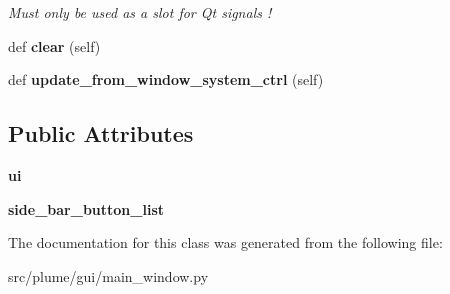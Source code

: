 \begin{DoxyCompactItemize}
\begin{DoxyCompactList}\small\item\em Must only be used as a slot for Qt signals ! \end{DoxyCompactList}\item 
def {\bfseries clear} (self)\hypertarget{classplume-creator_1_1src_1_1plume_1_1gui_1_1main__window_1_1_side_bar_a949f124568cf97ff7f7131efe75b008b}{}\label{classplume-creator_1_1src_1_1plume_1_1gui_1_1main__window_1_1_side_bar_a949f124568cf97ff7f7131efe75b008b}

\item 
def {\bfseries update\+\_\+from\+\_\+window\+\_\+system\+\_\+ctrl} (self)\hypertarget{classplume-creator_1_1src_1_1plume_1_1gui_1_1main__window_1_1_side_bar_a98cfba7845f1b5f1a1de0ee367d4e120}{}\label{classplume-creator_1_1src_1_1plume_1_1gui_1_1main__window_1_1_side_bar_a98cfba7845f1b5f1a1de0ee367d4e120}

\end{DoxyCompactItemize}
\subsection*{Public Attributes}
\begin{DoxyCompactItemize}
\item 
{\bfseries ui}\hypertarget{classplume-creator_1_1src_1_1plume_1_1gui_1_1main__window_1_1_side_bar_a2898a083794a2d582dc7e06d048fac1d}{}\label{classplume-creator_1_1src_1_1plume_1_1gui_1_1main__window_1_1_side_bar_a2898a083794a2d582dc7e06d048fac1d}

\item 
{\bfseries side\+\_\+bar\+\_\+button\+\_\+list}\hypertarget{classplume-creator_1_1src_1_1plume_1_1gui_1_1main__window_1_1_side_bar_ace99404751064f19b65f5156f50d076d}{}\label{classplume-creator_1_1src_1_1plume_1_1gui_1_1main__window_1_1_side_bar_ace99404751064f19b65f5156f50d076d}

\end{DoxyCompactItemize}


The documentation for this class was generated from the following file\+:\begin{DoxyCompactItemize}
\item 
src/plume/gui/main\+\_\+window.\+py\end{DoxyCompactItemize}
